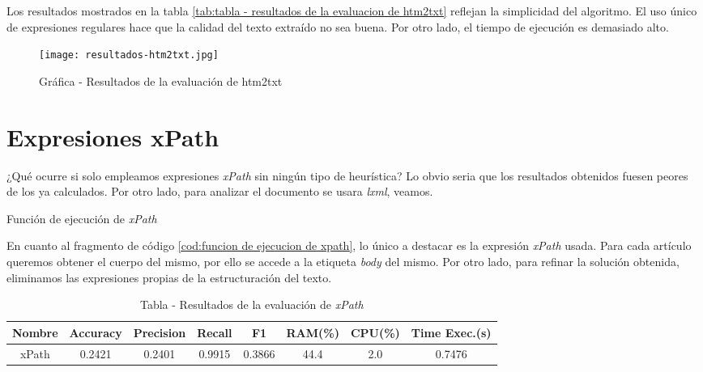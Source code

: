 Los resultados mostrados en la tabla \ref{tab:tabla - resultados de la evaluacion de htm2txt} reflejan la
simplicidad del algoritmo. El uso único de expresiones regulares hace que la calidad del texto extraído
no sea buena. Por otro lado, el tiempo de ejecución es demasiado alto.

\begin{figure}[tphb]
    \centering
    \texttt{[image: resultados-htm2txt.jpg]}
    \caption{Gráfica - Resultados de la evaluación de htm2txt}
    \label{img:grafica - resultados de la evaluacion de htm2txt}
\end{figure}

\section*{Expresiones xPath}

¿Qué ocurre si solo empleamos expresiones \emph{xPath} sin ningún tipo de heurística? Lo obvio seria que
los resultados obtenidos fuesen peores de los ya calculados. Por otro lado, para analizar el documento se 
usara \emph{lxml}, veamos.

\begin{codefloat}
    
    \caption{Función de ejecución de \emph{xPath}}
    \label{cod:funcion de ejecucion de xpath}
\end{codefloat}

En cuanto al fragmento de código \ref{cod:funcion de ejecucion de xpath}, lo único a destacar es la expresión
\emph{xPath} usada. Para cada artículo queremos obtener el cuerpo del mismo, por ello se accede a la 
etiqueta \emph{body} del mismo. Por otro lado, para refinar la solución obtenida, eliminamos las expresiones 
propias de la estructuración del texto.

\begin{table}[h]
    \begin{center}
      \begin{tabular}{| c | c | c | c | c | c | c | c |} \hline 
       \textbf{Nombre} & \textbf{Accuracy} & \textbf{Precision}  & \textbf{Recall} & \textbf{F1} & \textbf{RAM(\%)} & \textbf{CPU(\%)} & \textbf{Time Exec.(s)} \\ \hline
       xPath & 0.2421 & 0.2401 & 0.9915 & 0.3866 & 44.4 & 2.0 & 0.7476 \\ \hline
      \end{tabular}
      \caption{Tabla - Resultados de la evaluación de \emph{xPath}}
      \label{tab:tabla - resultados de la evaluacion de xpath}
    \end{center}
\end{table}

